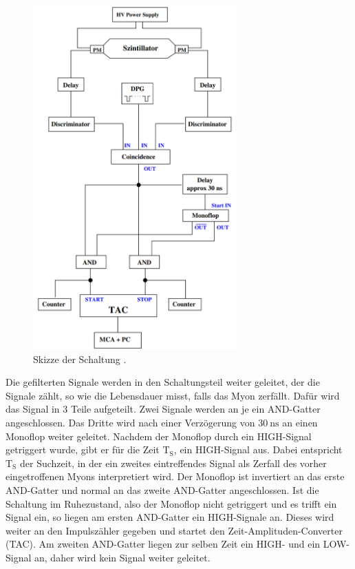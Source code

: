 \begin{figure}
    \centering
    \includegraphics[width= 0.7\textwidth]{plots/V01_Aufbau.png}
    \caption{Skizze der Schaltung \cite{V01}.}
    \label{fig:1}
\end{figure}
Die gefilterten Signale werden in den Schaltungsteil weiter geleitet, der die Signale zählt, so wie die Lebensdauer misst, falls das Myon zerfällt.
Dafür wird das Signal in 3 Teile aufgeteilt.
Zwei Signale werden an je ein AND-Gatter angeschlossen. 
Das Dritte wird nach einer Verzögerung von $\SI{30}{\nano\second}$ an einen Monoflop weiter geleitet.
Nachdem der Monoflop durch ein HIGH-Signal getriggert wurde, gibt er für die Zeit T$_{\text{S}}$, ein HIGH-Signal aus.
Dabei entspricht T$_{\text{S}}$ der Suchzeit, in der ein zweites eintreffendes Signal als Zerfall des vorher eingetroffenen Myons interpretiert wird.
Der Monoflop ist invertiert an das erste AND-Gatter und normal an das zweite AND-Gatter angeschlossen.
Ist die Schaltung im Ruhezustand, also der Monoflop nicht getriggert und es trifft ein Signal ein, so liegen am ersten AND-Gatter ein HIGH-Signale an.
Dieses wird weiter an den Impulszähler gegeben und startet den Zeit-Amplituden-Converter (TAC).
Am zweiten AND-Gatter liegen zur selben Zeit ein HIGH- und ein LOW-Signal an, daher wird kein Signal weiter geleitet.

